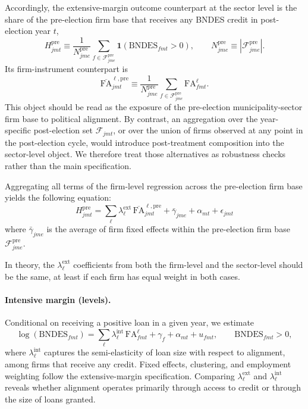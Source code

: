 \documentclass{article}
\newcommand{\FA}{\mathrm{FA}}
\begin{document}
Accordingly, the extensive-margin outcome counterpart at the sector level is the share
of the pre-election firm base that receives any BNDES credit in post-election
year $t$,
\[
  H^{\mathrm{pre}}_{jmt}
  \equiv
  \frac{1}{N^{\mathrm{pre}}_{jme}}
  \sum_{f \in \mathcal{F}^{\mathrm{pre}}_{jme}}
  \mathbf{1}(\text{BNDES}_{fmt} > 0),
  \qquad
  N^{\mathrm{pre}}_{jme} \equiv \left|\mathcal{F}^{\mathrm{pre}}_{jme}\right|.
\]
Its firm-instrument counterpart is
\[
  \overline{\FA}^{\ell,\mathrm{pre}}_{jmt}
  \equiv
  \frac{1}{N^{\mathrm{pre}}_{jme}}
  \sum_{f \in \mathcal{F}^{\mathrm{pre}}_{jme}}
  \FA^\ell_{fmt}.
\]
This object should be read as the exposure of the pre-election
municipality-sector firm base to political alignment. By contrast, an
aggregation over the year-specific post-election set
$\mathcal{F}_{jmt}$, or over the union of firms observed at any point in the
post-election cycle, would introduce post-treatment composition into the
sector-level object. We therefore treat those alternatives as robustness
checks rather than the main specification.

Aggregating all terms of the firm-level regression across the pre-election firm base yields the following equation:
\[
  H^{\mathrm{pre}}_{jmt} = \sum_{\ell} \lambda^{\text{ext}}_{\ell}\, \overline{\FA}^{\ell,\mathrm{pre}}_{jmt}
  + \bar{\gamma}_{jme} + \alpha_{mt} + \epsilon_{jmt}
\]
where $\bar{\gamma}_{jme}$ is the average of firm fixed effects within the pre-election firm base $\mathcal{F}^{\mathrm{pre}}_{jme}$.

In theory, the $\lambda ^{\text{ext}}_\ell$ coefficients from both the firm-level and the sector-level should be the same, at least if each firm has equal weight in both cases.

\paragraph{Intensive margin (levels).}
Conditional on receiving a positive loan in a given year, we estimate
\[
  \log(\text{BNDES}_{fmt}) = \sum_{\ell} \lambda^{\text{int}}_{\ell}\, \FA^{\ell}_{fmt}
  + \gamma_{f} + \alpha_{mt} + u_{fmt},
  \qquad \text{BNDES}_{fmt} > 0,
\]
where $\lambda^{\text{int}}_\ell$ captures the semi-elasticity of loan size
with respect to alignment, among firms that receive any credit.
Fixed effects, clustering, and employment weighting follow the extensive-margin specification.
Comparing $\lambda^{\text{ext}}_\ell$ and $\lambda^{\text{int}}_\ell$ reveals
whether alignment operates primarily through access to credit or through the size of loans granted.
\end{document}
